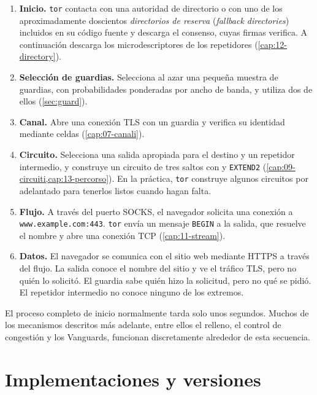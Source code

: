 \begin{enumerate}
  \item \textbf{Inicio.} \texttt{tor} contacta con una autoridad de directorio o con uno de los aproximadamente doscientos \emph{directorios de reserva} (\emph{fallback directories}) incluidos en su código fuente y descarga el consenso, cuyas firmas verifica. A continuación descarga los microdescriptores de los repetidores (\cref{cap:12-directory}).
  \item \textbf{Selección de guardias.} Selecciona al azar una pequeña muestra de guardias, con probabilidades ponderadas por ancho de banda, y utiliza dos de ellos (\cref{sec:guard}).
  \item \textbf{Canal.} Abre una conexión TLS con un guardia y verifica su identidad mediante celdas  (\cref{cap:07-canali}).
  \item \textbf{Circuito.} Selecciona una salida apropiada para el destino y un repetidor intermedio, y construye un circuito de tres saltos con  y \texttt{EXTEND2} (\cref{cap:09-circuiti,cap:13-percorso}). En la práctica, \texttt{tor} construye algunos circuitos por adelantado para tenerlos listos cuando hagan falta.
  \item \textbf{Flujo.} A través del puerto SOCKS, el navegador solicita una conexión a \texttt{www.\allowbreak example.\allowbreak com:443}. \texttt{tor} envía un mensaje \texttt{BEGIN} a la salida, que resuelve el nombre y abre una conexión TCP (\cref{cap:11-stream}).
  \item \textbf{Datos.} El navegador se comunica con el sitio web mediante HTTPS a través del flujo. La salida conoce el nombre del sitio y ve el tráfico TLS, pero no quién lo solicitó. El guardia sabe quién hizo la solicitud, pero no qué se pidió. El repetidor intermedio no conoce ninguno de los extremos.
\end{enumerate}

El proceso completo de inicio normalmente tarda solo unos segundos. Muchos de los mecanismos descritos más adelante, entre ellos el relleno, el control de congestión y los Vanguards, funcionan discretamente alrededor de esta secuencia.

\section{Implementaciones y versiones}\label{sec:arch-versioni}

